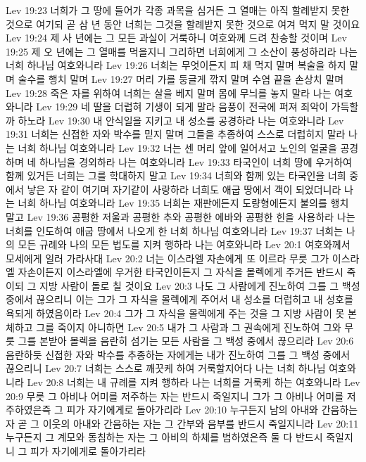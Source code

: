 Lev 19:23  너희가 그 땅에 들어가 각종 과목을 심거든 그 열매는 아직 할례받지 못한 것으로 여기되 곧 삼 년 동안 너희는 그것을 할례받지 못한 것으로 여겨 먹지 말 것이요
Lev 19:24  제 사 년에는 그 모든 과실이 거룩하니 여호와께 드려 찬송할 것이며
Lev 19:25  제 오 년에는 그 열매를 먹을지니 그리하면 너희에게 그 소산이 풍성하리라 나는 너희 하나님 여호와니라
Lev 19:26  너희는 무엇이든지 피 채 먹지 말며 복술을 하지 말며 술수를 행치 말며
Lev 19:27  머리 가를 둥글게 깎지 말며 수염 끝을 손상치 말며
Lev 19:28  죽은 자를 위하여 너희는 살을 베지 말며 몸에 무늬를 놓지 말라 나는 여호와니라
Lev 19:29  네 딸을 더럽혀 기생이 되게 말라 음풍이 전국에 퍼져 죄악이 가득할까 하노라
Lev 19:30  내 안식일을 지키고 내 성소를 공경하라 나는 여호와니라
Lev 19:31  너희는 신접한 자와 박수를 믿지 말며 그들을 추종하여 스스로 더럽히지 말라 나는 너희 하나님 여호와니라
Lev 19:32  너는 센 머리 앞에 일어서고 노인의 얼굴을 공경하며 네 하나님을 경외하라 나는 여호와니라
Lev 19:33  타국인이 너희 땅에 우거하여 함께 있거든 너희는 그를 학대하지 말고
Lev 19:34  너희와 함께 있는 타국인을 너희 중에서 낳은 자 같이 여기며 자기같이 사랑하라 너희도 애굽 땅에서 객이 되었더니라 나는 너희 하나님 여호와니라
Lev 19:35  너희는 재판에든지 도량형에든지 불의를 행치 말고
Lev 19:36  공평한 저울과 공평한 추와 공평한 에바와 공평한 힌을 사용하라 나는 너희를 인도하여 애굽 땅에서 나오게 한 너희 하나님 여호와니라
Lev 19:37  너희는 나의 모든 규례와 나의 모든 법도를 지켜 행하라 나는 여호와니라
Lev 20:1  여호와께서 모세에게 일러 가라사대
Lev 20:2  너는 이스라엘 자손에게 또 이르라 무릇 그가 이스라엘 자손이든지 이스라엘에 우거한 타국인이든지 그 자식을 몰렉에게 주거든 반드시 죽이되 그 지방 사람이 돌로 칠 것이요
Lev 20:3  나도 그 사람에게 진노하여 그를 그 백성 중에서 끊으리니 이는 그가 그 자식을 몰렉에게 주어서 내 성소를 더럽히고 내 성호를 욕되게 하였음이라
Lev 20:4  그가 그 자식을 몰렉에게 주는 것을 그 지방 사람이 못 본 체하고 그를 죽이지 아니하면
Lev 20:5  내가 그 사람과 그 권속에게 진노하여 그와 무릇 그를 본받아 몰렉을 음란히 섬기는 모든 사람을 그 백성 중에서 끊으리라
Lev 20:6  음란하듯 신접한 자와 박수를 추종하는 자에게는 내가 진노하여 그를 그 백성 중에서 끊으리니
Lev 20:7  너희는 스스로 깨끗케 하여 거룩할지어다 나는 너희 하나님 여호와니라
Lev 20:8  너희는 내 규례를 지켜 행하라 나는 너희를 거룩케 하는 여호와니라
Lev 20:9  무릇 그 아비나 어미를 저주하는 자는 반드시 죽일지니 그가 그 아비나 어미를 저주하였은즉 그 피가 자기에게로 돌아가리라
Lev 20:10  누구든지 남의 아내와 간음하는 자 곧 그 이웃의 아내와 간음하는 자는 그 간부와 음부를 반드시 죽일지니라
Lev 20:11  누구든지 그 계모와 동침하는 자는 그 아비의 하체를 범하였은즉 둘 다 반드시 죽일지니 그 피가 자기에게로 돌아가리라
